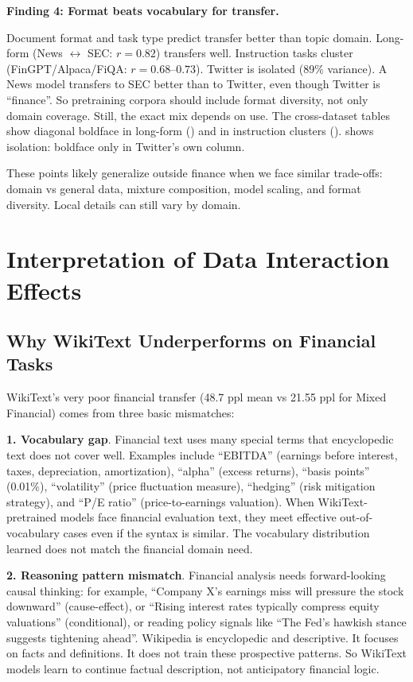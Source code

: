 \textbf{Finding 4: Format beats vocabulary for transfer.}

Document format and task type predict transfer better than topic domain. Long-form (News $\leftrightarrow$ SEC: $r = 0.82$) transfers well. Instruction tasks cluster (FinGPT/Alpaca/FiQA: $r = 0.68$--$0.73$). Twitter is isolated (89\% variance). A News model transfers to SEC better than to Twitter, even though Twitter is ``finance''. So pretraining corpora should include format diversity, not only domain coverage. Still, the exact mix depends on use. The cross-dataset tables show diagonal boldface in long-form () and in instruction clusters ().  shows isolation: boldface only in Twitter's own column.

These points likely generalize outside finance when we face similar trade-offs: domain vs general data, mixture composition, model scaling, and format diversity. Local details can still vary by domain.

\section{Interpretation of Data Interaction Effects}

\subsection{Why WikiText Underperforms on Financial Tasks}

WikiText's very poor financial transfer (48.7 ppl mean vs 21.55 ppl for Mixed Financial) comes from three basic mismatches:

\textbf{1. Vocabulary gap}. Financial text uses many special terms that encyclopedic text does not cover well. Examples include ``EBITDA'' (earnings before interest, taxes, depreciation, amortization), ``alpha'' (excess returns), ``basis points'' (0.01\%), ``volatility'' (price fluctuation measure), ``hedging'' (risk mitigation strategy), and ``P/E ratio'' (price-to-earnings valuation). When WikiText-pretrained models face financial evaluation text, they meet effective out-of-vocabulary cases even if the syntax is similar. The vocabulary distribution learned does not match the financial domain need.

\textbf{2. Reasoning pattern mismatch}. Financial analysis needs forward-looking causal thinking: for example, ``Company X's earnings miss will pressure the stock downward'' (cause-effect), or ``Rising interest rates typically compress equity valuations'' (conditional), or reading policy signals like ``The Fed's hawkish stance suggests tightening ahead''. Wikipedia is encyclopedic and descriptive. It focuses on facts and definitions. It does not train these prospective patterns. So WikiText models learn to continue factual description, not anticipatory financial logic.

